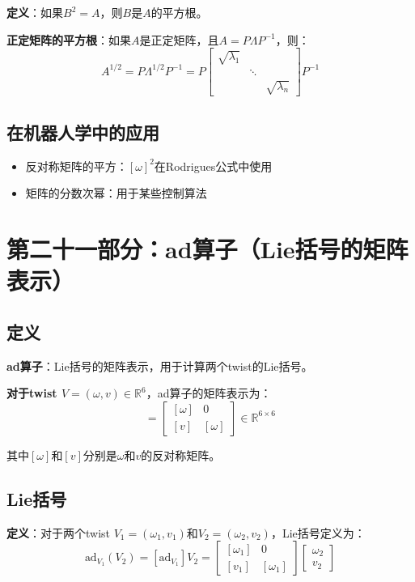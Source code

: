\documentclass[12pt,a4paper]{article}
\begin{document}
\textbf{定义}：如果$B^2 = A$，则$B$是$A$的平方根。

\textbf{正定矩阵的平方根}：如果$A$是正定矩阵，且$A = P \Lambda P^{-1}$，则：
\begin{equation}
A^{1/2} = P \Lambda^{1/2} P^{-1} = P \begin{bmatrix} \sqrt{\lambda_1} & & \\ & \ddots & \\ & & \sqrt{\lambda_n} \end{bmatrix} P^{-1}
\end{equation}

\subsection{在机器人学中的应用}

\begin{itemize}
\item 反对称矩阵的平方：$[\omega]^2$在Rodrigues公式中使用
\item 矩阵的分数次幂：用于某些控制算法
\end{itemize}

\section{第二十一部分：ad算子（Lie括号的矩阵表示）}

\subsection{定义}

\textbf{ad算子}：Lie括号的矩阵表示，用于计算两个twist的Lie括号。

\textbf{对于twist $V = (\omega, v) \in \mathbb{R}^6$}，ad算子的矩阵表示为：
\begin{equation}
[\text{ad}_V] = \begin{bmatrix} [\omega] & 0 \\ [v] & [\omega] \end{bmatrix} \in \mathbb{R}^{6 \times 6}
\end{equation}

其中$[\omega]$和$[v]$分别是$\omega$和$v$的反对称矩阵。

\subsection{Lie括号}

\textbf{定义}：对于两个twist $V_1 = (\omega_1, v_1)$和$V_2 = (\omega_2, v_2)$，Lie括号定义为：
\begin{equation}
\text{ad}_{V_1}(V_2) = [\text{ad}_{V_1}] V_2 = \begin{bmatrix} [\omega_1] & 0 \\ [v_1] & [\omega_1] \end{bmatrix} \begin{bmatrix} \omega_2 \\ v_2 \end{bmatrix}
\end{equation}
\end{document}
